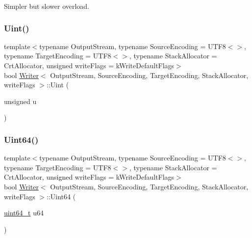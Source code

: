 Simpler but slower overload. 

\mbox{\label{classWriter_a5fb0c3228f89f6f9bef15f3e6e6f1739}} 
\subsubsection{\texorpdfstring{Uint()}{Uint()}}
{\footnotesize\ttfamily template$<$typename Output\+Stream, typename Source\+Encoding = U\+T\+F8$<$$>$, typename Target\+Encoding = U\+T\+F8$<$$>$, typename Stack\+Allocator = Crt\+Allocator, unsigned write\+Flags = k\+Write\+Default\+Flags$>$ \\
bool \hyperlink{classWriter}{Writer}$<$ Output\+Stream, Source\+Encoding, Target\+Encoding, Stack\+Allocator, write\+Flags $>$\+::Uint (\begin{DoxyParamCaption}\item[{unsigned}]{u }\end{DoxyParamCaption})\hspace{0.3cm}{\ttfamily [inline]}}

\mbox{\label{classWriter_a55bb9f286ecdaf4cdb07bddb02e0cb2d}} 
\subsubsection{\texorpdfstring{Uint64()}{Uint64()}}
{\footnotesize\ttfamily template$<$typename Output\+Stream, typename Source\+Encoding = U\+T\+F8$<$$>$, typename Target\+Encoding = U\+T\+F8$<$$>$, typename Stack\+Allocator = Crt\+Allocator, unsigned write\+Flags = k\+Write\+Default\+Flags$>$ \\
bool \hyperlink{classWriter}{Writer}$<$ Output\+Stream, Source\+Encoding, Target\+Encoding, Stack\+Allocator, write\+Flags $>$\+::Uint64 (\begin{DoxyParamCaption}\item[{\hyperlink{stdint_8h_aec6fcb673ff035718c238c8c9d544c47}{uint64\+\_\+t}}]{u64 }\end{DoxyParamCaption})\hspace{0.3cm}{\ttfamily [inline]}}

\mbox{\label{classWriter_a42ad68b6950431bb8ca0199568546eaf}} 
